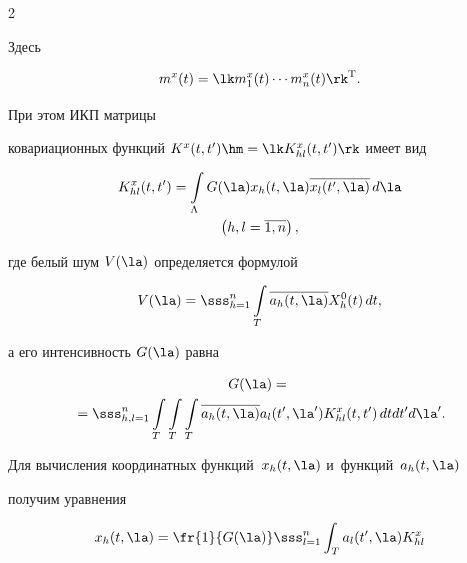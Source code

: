 \begin{multicols}{2}
%

Здесь 

$$

m^x (t) = \lk m_1^x (t) \cdots m_n^x (t)\rk^{\mathrm{T}}.

$$

 При этом ИКП матрицы 

ковариационных функций $K^x (t, t') \hm= \lk K_{hl}^x (t,t')\rk$ имеет вид

       \begin{multline}

    K_{hl}^x (t,t') = \int\limits_\Lambda G(\la) x_h (t,\la) \overline{x_l(t',\la)} 

\,d\la \\

 \left( h,l=\overline{1,n}\right),

\label{e2.2-s2}

\end{multline}

где белый шум $V(\la)$  определяется формулой

    $$

    V(\la) = \sss_{h=1}^n \int\limits_T \overline{a_h (t,\la)} X_h^0 (t)\,dt,

    $$

а его интенсивность $G(\la)$ равна



\vspace*{-4pt}



\noindent

   \begin{multline*}

    G(\la) ={}\\

    {}= \sss_{h,l=1}^n \int\limits_T \int\limits_T \int\limits_T \overline{a_h (t,\la)} a_l (t',\la') K_{hl}^x (t,t')\, dtdt'd\la'.

\end{multline*}

Для вычисления координатных функций~$x_h (t,\la)$ и~функций~$a_h (t,\la)$ 

получим  уравнения



\vspace*{-4pt}



\noindent

    \begin{multline}

    x_h (t,\la) =\fr{1}{G(\la)} \sss_{l=1}^n \int_T a_l (t',\la) K_{hl}^x 


\end{multline}
\end{multicols}
